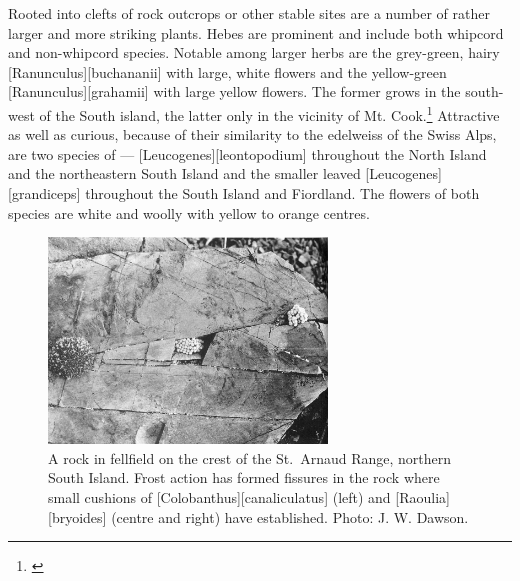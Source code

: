 Rooted into clefts of rock outcrops or other stable sites are a number of rather larger and more striking plants.
Hebes are prominent and include both whipcord and non-whipcord species.
Notable among larger herbs are the grey-green, hairy [Ranunculus][buchananii] with large, white flowers and the yellow-green [Ranunculus][grahamii] with large yellow flowers.
The former grows in the south-west of the South island, the latter only in the vicinity of Mt.
Cook.\footnote{\cite{wilson1978wild}}
Attractive as well as curious, because of their similarity to the edelweiss of the Swiss Alps, are two species of  --- [Leucogenes][leontopodium] throughout the North Island and the northeastern South Island and the smaller leaved [Leucogenes][grandiceps] throughout the South Island and Fiordland.
The flowers of both species are white and woolly with yellow to orange centres.

\begin{figure}
	\includegraphics[width=0.66\textwidth]{graphics/figure107fellfield-rock.jpg}
	\centering
	\caption[A rock in fellfield on the crest of the St.\ Arnaud Range]{A rock in fellfield on the crest of the St.\ Arnaud Range, northern South Island.
	Frost action has formed fissures in the rock where small cushions of [Colobanthus][canaliculatus] (left) and [Raoulia][bryoides] (centre and right) have established.
	Photo: J. W. Dawson.}%
	\label{fig:107fellfield-rock}
\end{figure}

